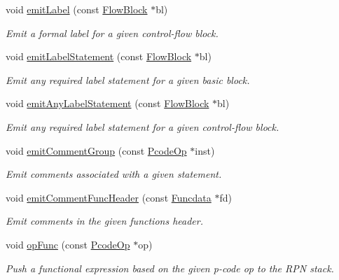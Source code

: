 \begin{DoxyCompactItemize}
void \mbox{\hyperlink{class_print_c_ac8dc5f836c6c487956b03a55a9d8241f}{emit\+Label}} (const \mbox{\hyperlink{class_flow_block}{Flow\+Block}} $\ast$bl)
\begin{DoxyCompactList}\small\item\em Emit a formal label for a given control-\/flow block. \end{DoxyCompactList}\item 
void \mbox{\hyperlink{class_print_c_ad237ae57af8296e4575fd083972c5b21}{emit\+Label\+Statement}} (const \mbox{\hyperlink{class_flow_block}{Flow\+Block}} $\ast$bl)
\begin{DoxyCompactList}\small\item\em Emit any required label statement for a given basic block. \end{DoxyCompactList}\item 
void \mbox{\hyperlink{class_print_c_a949cd93dbebadf75fad1befc87776285}{emit\+Any\+Label\+Statement}} (const \mbox{\hyperlink{class_flow_block}{Flow\+Block}} $\ast$bl)
\begin{DoxyCompactList}\small\item\em Emit any required label statement for a given control-\/flow block. \end{DoxyCompactList}\item 
void \mbox{\hyperlink{class_print_c_a010382bb95568ebcab6281ad284c0427}{emit\+Comment\+Group}} (const \mbox{\hyperlink{class_pcode_op}{Pcode\+Op}} $\ast$inst)
\begin{DoxyCompactList}\small\item\em Emit comments associated with a given statement. \end{DoxyCompactList}\item 
void \mbox{\hyperlink{class_print_c_a1fe6d706578ca30a11d508fba6b1ac2e}{emit\+Comment\+Func\+Header}} (const \mbox{\hyperlink{class_funcdata}{Funcdata}} $\ast$fd)
\begin{DoxyCompactList}\small\item\em Emit comments in the given function\textquotesingle{}s header. \end{DoxyCompactList}\item 
void \mbox{\hyperlink{class_print_c_a436588b5fb6b79a094c61db84eff9297}{op\+Func}} (const \mbox{\hyperlink{class_pcode_op}{Pcode\+Op}} $\ast$op)
\begin{DoxyCompactList}\small\item\em Push a {\itshape functional} expression based on the given p-\/code op to the R\+PN stack. \end{DoxyCompactList}\item 

\end{DoxyCompactItemize}
